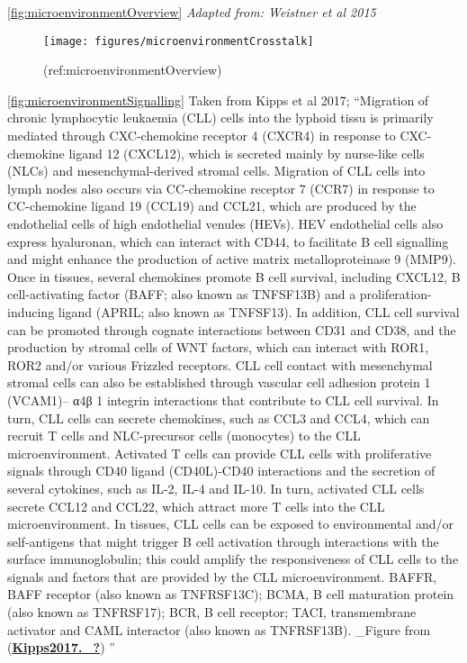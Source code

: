\documentclass[11pt, a4paper, twosided]{book}
\begin{document}
\ref{fig:microenvironmentOverview} \emph{Adapted from: Weistner et al 2015}
\begin{figure}

{\centering \texttt{[image: figures/microenvironmentCrosstalk]} 

}

\caption{(ref:microenvironmentOverview)}\label{fig:microenvironmentCrosstalk}
\end{figure}
\ref{fig:microenvironmentSignalling} Taken from Kipps et al 2017; ``Migration of chronic lymphocytic leukaemia (CLL) cells into the lyphoid tissu is primarily mediated through CXC-chemokine receptor 4 (CXCR4) in response to CXC-chemokine ligand 12 (CXCL12), which is secreted mainly by nurse-like cells (NLCs) and mesenchymal-derived stromal cells. Migration of CLL cells into lymph nodes also occurs via CC-chemokine receptor 7 (CCR7) in response to CC-chemokine ligand 19 (CCL19) and CCL21, which are produced by the endothelial cells of high endothelial venules (HEVs). HEV endothelial cells also express hyaluronan, which can interact with CD44, to facilitate B cell signalling and might enhance the production of active matrix metalloproteinase 9 (MMP9). Once in tissues, several chemokines promote B cell survival, including CXCL12, B cell-activating factor (BAFF; also known as TNFSF13B) and a proliferation-inducing ligand (APRIL; also known as TNFSF13). In addition, CLL cell survival can be promoted through cognate interactions between CD31 and CD38, and the production by stromal cells of WNT factors, which can interact with ROR1, ROR2 and/or various Frizzled receptors. CLL cell contact with mesenchymal stromal cells can also be established through vascular cell adhesion protein 1 (VCAM1)-- α4β 1 integrin interactions that contribute to CLL cell survival. In turn, CLL cells can secrete chemokines, such as CCL3 and CCL4, which can recruit T cells and NLC-precursor cells (monocytes) to the CLL microenvironment. Activated T cells can provide CLL cells with proliferative signals through CD40 ligand (CD40L)-CD40 interactions and the secretion of several cytokines, such as IL-2, IL-4 and IL-10. In turn, activated CLL cells secrete CCL12 and CCL22, which attract more T cells into the CLL microenvironment. In tissues, CLL cells can be exposed to environmental and/or self-antigens that might trigger B cell activation through interactions with the surface immunoglobulin; this could amplify the responsiveness of CLL cells to the signals and factors that are provided by the CLL microenvironment. BAFFR, BAFF receptor (also known as TNFRSF13C); BCMA, B cell maturation protein (also known as TNFRSF17); BCR, B cell receptor; TACI, transmembrane activator and CAML interactor (also known as TNFRSF13B). \_Figure from (\protect\hyperlink{ref-Kipps2017._}{\textbf{Kipps2017.\_?}}) ''
\end{document}

